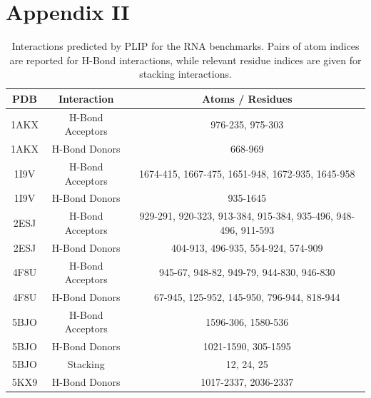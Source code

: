 \chapter*{Appendix II}


\begin{table}[H]
  \caption{\label{tab:appx2/plip} Interactions predicted by PLIP for the RNA benchmarks. Pairs of atom indices are reported for H-Bond interactions, while relevant residue indices are given for stacking interactions.}
  \centering
  \begin{tabular}{ccc}
    \hline
    PDB  & Interaction      & Atoms / Residues                                              \\ \hline
    1AKX & H-Bond Acceptors & 976-235, 975-303                                              \\
    1AKX & H-Bond Donors    & 668-969                                                       \\
    1I9V & H-Bond Acceptors & 1674-415, 1667-475, 1651-948, 1672-935, 1645-958              \\
    1I9V & H-Bond Donors    & 935-1645                                                      \\
    2ESJ & H-Bond Acceptors & 929-291, 920-323, 913-384, 915-384, 935-496, 948-496, 911-593 \\
    2ESJ & H-Bond Donors    & 404-913, 496-935, 554-924, 574-909                            \\
    4F8U & H-Bond Acceptors & 945-67, 948-82, 949-79, 944-830, 946-830                      \\
    4F8U & H-Bond Donors    & 67-945, 125-952, 145-950, 796-944, 818-944                    \\
    5BJO & H-Bond Acceptors & 1596-306, 1580-536                                            \\
    5BJO & H-Bond Donors    & 1021-1590, 305-1595                                           \\
    5BJO & Stacking         & 12, 24, 25                                                    \\
    5KX9 & H-Bond Donors    & 1017-2337, 2036-2337                                          \\

\end{tabular}
\end{table}
